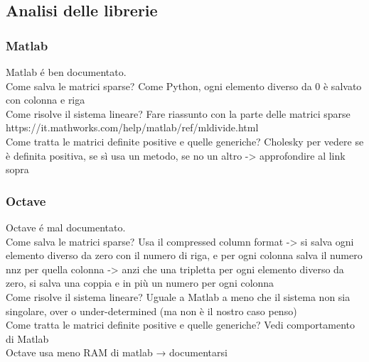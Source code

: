 \documentclass{beamer}
\begin{document}
\subsection{Analisi delle librerie}

\begin{frame}
	
	\frametitle{Matlab}
Matlab \'e ben documentato.\\
Come salva le matrici sparse? Come Python, ogni elemento diverso da 0 è salvato con colonna e riga\\
Come risolve il sistema lineare? Fare riassunto con la parte delle matrici sparse https://it.mathworks.com/help/matlab/ref/mldivide.html\\
Come tratta le matrici definite positive e quelle generiche? Cholesky per vedere se è definita positiva, se sì usa un metodo, se no un altro -> approfondire al link sopra
\end{frame}


\begin{frame}
\frametitle{Octave}
Octave \'e mal documentato. \\
Come salva le matrici sparse? Usa il compressed column format -> si salva ogni elemento diverso da zero con il numero di riga, e per ogni colonna salva il numero nnz per quella colonna -> anzi che una tripletta per ogni elemento diverso da zero, si salva una coppia e in più un numero per ogni colonna\\
Come risolve il sistema lineare? Uguale a Matlab a meno che il sistema non sia singolare, over o under-determined (ma non è il nostro caso penso)\\
Come tratta le matrici definite positive e quelle generiche? Vedi comportamento di Matlab\\

Octave usa meno RAM di matlab → documentarsi
\end{frame}
\end{document}
